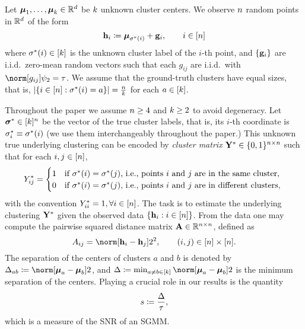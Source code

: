 \begin{mdl}\label{mdl:SGMM} Let $\boldsymbol{\mu}_{1},\ldots,\boldsymbol{\mu}_{k}\in\mathbb{R}^{d}$
be $k$ unknown cluster centers. We observe $n$ random
points in $\mathbb{R}^{d}$ of the form 
\[
\mathbf{h}_{i}\coloneqq\boldsymbol{\mu}_{\sigma^{*}(i)}+\mathbf{g}_{i},\qquad i\in\left[n\right]
\]
where $\sigma^{*}(i)\in[k]$ is the unknown cluster label
of the $i$-th point, and $\left\{ \mathbf{g}_{i}\right\} $ are i.i.d.~zero-mean random
vectors such that each $g_{ij}$ are i.i.d.~with $\norm[g_{ij}]{\psi_{2}}=\sgnorm$.
We assume that the ground-truth clusters have equal sizes, that is,
$\left|\left\{ i\in\left[n\right]:\sigma^{*}(i)=a\right\} \right|=\frac{n}{k}$
for each $a\in\left[k\right]$.

\end{mdl}

Throughout the paper we assume $n\ge4$ and $k\ge2$ to
avoid degeneracy. Let $\boldsymbol{\sigma}^{*}\in[k]^{n}$ be the vector
of the true cluster labels, that is, its $i$-th coordinate is $\sigma^{*}_{i}\equiv\sigma^{*}(i)$
(we use them interchangeably throughout the paper.) This unknown true
underlying clustering can be encoded by \emph{cluster matrix} $\mathbf{Y}^{*}\in\{0,1\}^{n\times n}$
such that for each $i,j\in\left[n\right]$, 
\[
Y^{*}_{ij}=\begin{cases}
1 & \text{if \ensuremath{\sigma^{*}(i)=\sigma^{*}(j)}, i.e., points \ensuremath{i} and \ensuremath{j} are in the same cluster},\\
0 & \text{if \ensuremath{\sigma^{*}(i)=\sigma^{*}(j)}, i.e., points \ensuremath{i} and \ensuremath{j} are in different clusters, }
\end{cases}
\]
with the convention $Y^{*}_{ii}=1,\forall i\in[n]$. The task
is to estimate the underlying clustering $\mathbf{Y}^{*}$ given the observed
data $\{\mathbf{h}_{i}:i\in[n]\}$. From the data one may compute the pairwise
squared distance matrix $\mathbf{A}\in\mathbb{R}^{n\times n}$, defined
as 
\[
\adj_{ij}=\norm[\h_{i}-\h_{j}]2^{2},\qquad(i,j)\in[\num]\times[\num].
\]
The separation of the centers of clusters $a$ and $b$ is denoted
by $\minsep_{ab}\coloneqq\norm[\Mean_{a}-\Mean_{b}]2$, and $\minsep\coloneqq\min_{a\ne b\in\left[\numclust\right]}\norm[\Mean_{a}-\Mean_{b}]2$
is the minimum separation of the centers. Playing a crucial role in
our results is the quantity 
\begin{equation}
s\coloneqq\frac{\Delta}{\tau},\label{eq:snr}
\end{equation}
which is a measure of the SNR of an SGMM. 

